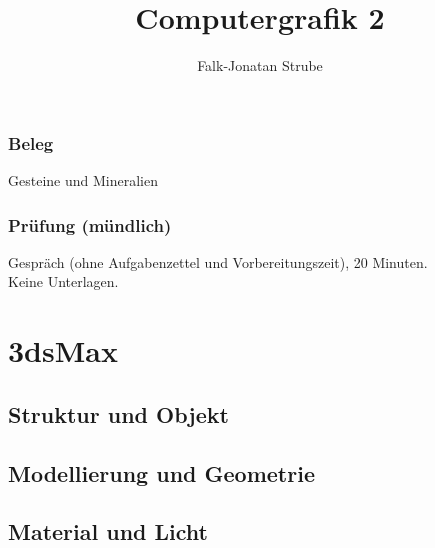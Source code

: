 \documentclass{scrreprt}
\title{Computergrafik 2}
\author{Falk-Jonatan Strube}
\begin{document}
\maketitle
\tableofcontents


\section*{Beleg}
Gesteine und Mineralien

\section*{Prüfung (mündlich)}
Gespräch (ohne Aufgabenzettel und Vorbereitungszeit), 20 Minuten.\\
Keine Unterlagen.

\part{3dsMax}

\chapter{Struktur und Objekt}


\chapter{Modellierung und Geometrie}


\chapter{Material und Licht}


\end{document}
